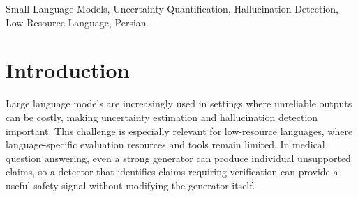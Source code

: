 \documentclass[conference]{IEEEtran}
\begin{document}
\begin{abstract}

Hallucination detection is particularly important for medical language models, but repeated-sampling approaches are computationally expensive. A faster alternative is a single-pass uncertainty head that predicts hallucination risk from a frozen generator's internal signals. Existing uncertainty heads consume backbone-specific features and tokenization, motivating adaptation when the backbone or language changes. We study two Persian medical models, Gaokerena-V and Gaokerena-R, on a 168-question Iranian medical entrance examination. Across five generations per question, Gaokerena-V produces the same option on only 14 questions and Gaokerena-R on 37, compared with 168 for Med-Gemma, indicating substantial response variability in the Gaokerena models. We therefore adapt the LLM Uncertainty Head (LUH) framework to these models and construct two paired claim-level hallucination datasets directly in Persian, with 1,600 responses per backbone. Lightweight heads are trained on frozen-backbone attention maps and token probabilities. On held-out test splits, the heads achieve PR-AUCs of 0.4820 and 0.4652, corresponding to 2.30 and 2.66 times their respective random baselines, and ROC-AUCs of 0.7852 and 0.7810. The resulting detectors require neither retrieval nor repeated sampling at inference.

\end{abstract}

\begin{IEEEkeywords}

Small Language Models, Uncertainty Quantification, Hallucination Detection, Low-Resource Language, Persian

\end{IEEEkeywords}

\section{Introduction}

Large language models are increasingly used in settings where unreliable outputs can be costly, making uncertainty estimation and hallucination detection important. This challenge is especially relevant for low-resource languages, where language-specific evaluation resources and tools remain limited. In medical question answering, even a strong generator can produce individual unsupported claims, so a detector that identifies claims requiring verification can provide a useful safety signal without modifying the generator itself.
\end{document}
